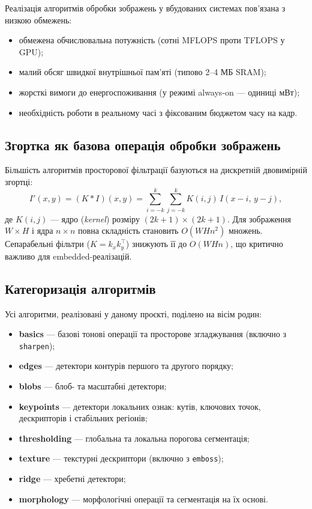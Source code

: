 \documentclass[a4paper,12pt]{article}
\begin{document}
Реалізація алгоритмів обробки зображень у вбудованих системах пов'язана з низкою обмежень:
\begin{itemize}
	\item обмежена обчислювальна потужність (сотні MFLOPS проти TFLOPS у GPU);
	\item малий обсяг швидкої внутрішньої пам'яті (типово 2--4 МБ SRAM);
	\item жорсткі вимоги до енергоспоживання (у режимі always-on --- одиниці мВт);
	\item необхідність роботи в реальному часі з фіксованим бюджетом часу на кадр.
\end{itemize}

\subsection{Згортка як базова операція обробки зображень}

Більшість алгоритмів просторової фільтрації базуються на дискретній двовимірній згортці:
\[
I'(x,y)=(K\ast I)(x,y)=\sum_{i=-k}^{k}\sum_{j=-k}^{k} K(i,j)\,I(x-i,\,y-j),
\]
де \(K(i,j)\) --- ядро (\textit{kernel}) розміру \((2k+1)\times(2k+1)\). Для зображення \(W\times H\) і ядра \(n\times n\) повна складність становить \(O(WHn^2)\) множень. Сепарабельні фільтри (\(K=k_x k_y^\top\)) знижують її до \(O(WHn)\), що критично важливо для embedded-реалізацій.

\subsection{Категоризація алгоритмів}

Усі алгоритми, реалізовані у даному проєкті, поділено на вісім родин:
\begin{itemize}
	\item \textbf{basics} --- базові тонові операції та просторове згладжування (включно з \texttt{sharpen});
	\item \textbf{edges} --- детектори контурів першого та другого порядку;
	\item \textbf{blobs} --- блоб- та масштабні детектори;
	\item \textbf{keypoints} --- детектори локальних ознак: кутів, ключових точок, дескрипторів і стабільних регіонів;
	\item \textbf{thresholding} --- глобальна та локальна порогова сегментація;
	\item \textbf{texture} --- текстурні дескриптори (включно з \texttt{emboss});
	\item \textbf{ridge} --- хребетні детектори;
	\item \textbf{morphology} --- морфологічні операції та сегментація на їх основі.
\end{itemize}
\end{document}
